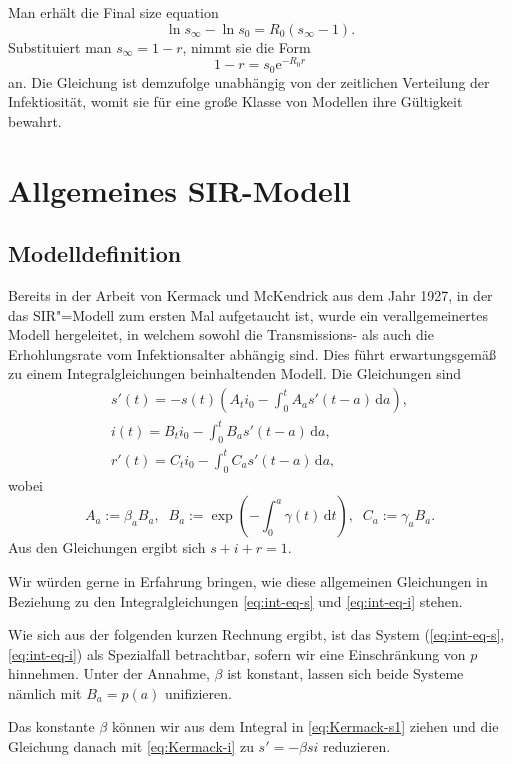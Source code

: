 \documentclass[a4paper,10pt,fleqn,twocolumn,twoside,dvipdfmx]{scrartcl}
\numberwithin{equation}{section}
\newcommand{\ee}{\mathrm e}
\begin{document}
Man erhält die Final size equation
\begin{equation}
\ln s_\infty - \ln s_0 = R_0(s_\infty - 1).
\end{equation}
Substituiert man $s_\infty = 1 - r$, nimmt sie die Form
\[1 - r = s_0\ee^{-R_0 r}\]
an. Die Gleichung ist demzufolge unabhängig von der zeitlichen
Verteilung der Infektiosität, womit sie für eine große Klasse von
Modellen ihre Gültigkeit bewahrt.


\clearpage
\section{Allgemeines SIR-Modell}

\subsection{Modelldefinition}

Bereits in der Arbeit \cite{Kermack} von Kermack und McKendrick aus
dem Jahr 1927, in der das SIR"=Modell zum ersten Mal aufgetaucht ist,
wurde ein verallgemeinertes Modell hergeleitet, in welchem
sowohl die Transmissions- als auch die Erhohlungsrate vom
Infektionsalter abhängig sind. Dies führt erwartungsgemäß
zu einem Integralgleichungen beinhaltenden Modell. Die Gleichungen sind
\begin{gather}
\label{eq:Kermack-s1}
s'(t) = -s(t)(A_t i_0 - \int_0^t A_a s'(t-a)\,\mathrm da),\\
\label{eq:Kermack-i}
i(t) = B_t i_0 - \int_0^t B_a s'(t-a)\,\mathrm da,\\
\label{eq:Kermack-r1}
r'(t) = C_t i_0 - \int_0^t C_a s'(t-a)\,\mathrm da,
\end{gather}
wobei
\[A_a := \beta_a B_a,\;\;
B_a := \exp(-{\textstyle\int_0^a} \gamma(t)\,\mathrm dt),\;\;
C_a := \gamma_a B_a.\]
Aus den Gleichungen ergibt sich $s+i+r=1$.

Wir würden gerne in Erfahrung bringen, wie diese allgemeinen
Gleichungen in Beziehung zu den Integralgleichungen
\eqref{eq:int-eq-s} und \eqref{eq:int-eq-i} stehen.

Wie sich aus der folgenden kurzen Rechnung ergibt, ist das
System (\ref{eq:int-eq-s}, \ref{eq:int-eq-i}) als Spezialfall
betrachtbar, sofern wir eine Einschränkung von $p$ hinnehmen.
Unter der Annahme, $\beta$ ist konstant,
lassen sich beide Systeme nämlich mit $B_a = p(a)$ unifizieren.

Das konstante $\beta$ können wir aus dem Integral in
\eqref{eq:Kermack-s1} ziehen und die Gleichung
danach mit \eqref{eq:Kermack-i} zu $s'=-\beta si$ reduzieren.
\end{document}
